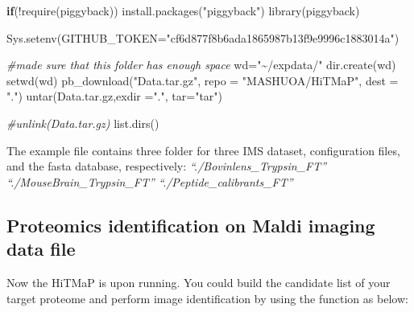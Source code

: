 \documentclass[
]{article}
\newenvironment{Shaded}{\begin{snugshade}}{\end{snugshade}}
\newcommand{\AttributeTok}[1]{\textcolor[rgb]{0.77,0.63,0.00}{#1}}
\newcommand{\CommentTok}[1]{\textcolor[rgb]{0.56,0.35,0.01}{\textit{#1}}}
\newcommand{\ControlFlowTok}[1]{\textcolor[rgb]{0.13,0.29,0.53}{\textbf{#1}}}
\newcommand{\FunctionTok}[1]{\textcolor[rgb]{0.00,0.00,0.00}{#1}}
\newcommand{\NormalTok}[1]{#1}
\newcommand{\OtherTok}[1]{\textcolor[rgb]{0.56,0.35,0.01}{#1}}
\newcommand{\SpecialCharTok}[1]{\textcolor[rgb]{0.00,0.00,0.00}{#1}}
\newcommand{\StringTok}[1]{\textcolor[rgb]{0.31,0.60,0.02}{#1}}
\begin{document}
\begin{Shaded}
\begin{Highlighting}[]
\ControlFlowTok{if}\NormalTok{(}\SpecialCharTok{!}\FunctionTok{require}\NormalTok{(piggyback)) }\FunctionTok{install.packages}\NormalTok{(}\StringTok{"piggyback"}\NormalTok{)}
\FunctionTok{library}\NormalTok{(piggyback)}

\FunctionTok{Sys.setenv}\NormalTok{(}\AttributeTok{GITHUB\_TOKEN=}\StringTok{"cf6d877f8b6ada1865987b13f9e9996c1883014a"}\NormalTok{)}

\CommentTok{\#made sure that this folder has enough space}
\NormalTok{wd}\OtherTok{=}\StringTok{"\textasciitilde{}/expdata/"}
\FunctionTok{dir.create}\NormalTok{(wd)}
\FunctionTok{setwd}\NormalTok{(wd)}
\FunctionTok{pb\_download}\NormalTok{(}\StringTok{"Data.tar.gz"}\NormalTok{, }\AttributeTok{repo =} \StringTok{"MASHUOA/HiTMaP"}\NormalTok{, }\AttributeTok{dest =} \StringTok{"."}\NormalTok{)}
\FunctionTok{untar}\NormalTok{(}\StringTok{\textquotesingle{}Data.tar.gz\textquotesingle{}}\NormalTok{,}\AttributeTok{exdir =}\StringTok{"."}\NormalTok{,  }\AttributeTok{tar=}\StringTok{"tar"}\NormalTok{)}

\CommentTok{\#unlink(\textquotesingle{}Data.tar.gz\textquotesingle{})}
\FunctionTok{list.dirs}\NormalTok{()}
\end{Highlighting}
\end{Shaded}

The example file contains three folder for three IMS dataset,
configuration files, and the fasta database, respectively:
\emph{``./Bovinlens\_Trypsin\_FT'' ``./MouseBrain\_Trypsin\_FT''
``./Peptide\_calibrants\_FT''}

\hypertarget{proteomics-identification-on-maldi-imaging-data-file}{%
\subsection{Proteomics identification on Maldi imaging data
file}\label{proteomics-identification-on-maldi-imaging-data-file}}

Now the HiTMaP is upon running. You could build the candidate list of
your target proteome and perform image identification by using the
function as below:
\end{document}
